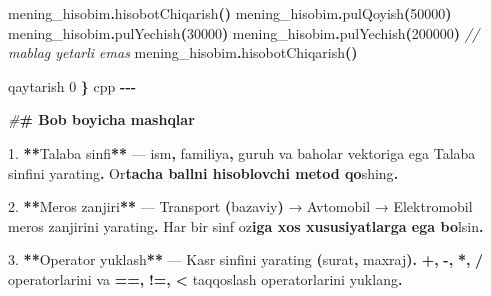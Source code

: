 \documentclass[a4paper,11pt,twoside,openright]{book}
\newenvironment{Shaded}{\begin{snugshade}}{\end{snugshade}}
\newcommand{\CharTok}[1]{\textcolor[rgb]{0.31,0.60,0.02}{#1}}
\newcommand{\CommentTok}[1]{\textcolor[rgb]{0.56,0.35,0.01}{\textit{#1}}}
\newcommand{\DecValTok}[1]{\textcolor[rgb]{0.00,0.00,0.81}{#1}}
\newcommand{\ErrorTok}[1]{\textcolor[rgb]{0.64,0.00,0.00}{\textbf{#1}}}
\newcommand{\FloatTok}[1]{\textcolor[rgb]{0.00,0.00,0.81}{#1}}
\newcommand{\NormalTok}[1]{#1}
\newcommand{\OperatorTok}[1]{\textcolor[rgb]{0.81,0.36,0.00}{\textbf{#1}}}
\newcommand{\PreprocessorTok}[1]{\textcolor[rgb]{0.56,0.35,0.01}{\textit{#1}}}
\begin{document}
\begin{Shaded}
\begin{Highlighting}[]
\NormalTok{    mening\_hisobim}\OperatorTok{.}\NormalTok{hisobotChiqarish}\OperatorTok{()}
\NormalTok{    mening\_hisobim}\OperatorTok{.}\NormalTok{pulQoyish}\OperatorTok{(}\DecValTok{50000}\OperatorTok{)}
\NormalTok{    mening\_hisobim}\OperatorTok{.}\NormalTok{pulYechish}\OperatorTok{(}\DecValTok{30000}\OperatorTok{)}
\NormalTok{    mening\_hisobim}\OperatorTok{.}\NormalTok{pulYechish}\OperatorTok{(}\DecValTok{200000}\OperatorTok{)}   \CommentTok{// mablag\textquotesingle{} yetarli emas}
\NormalTok{    mening\_hisobim}\OperatorTok{.}\NormalTok{hisobotChiqarish}\OperatorTok{()}

\NormalTok{    qaytarish }\DecValTok{0}
\OperatorTok{\}}
\ErrorTok{\textasciigrave{}\textasciigrave{}\textasciigrave{}}\NormalTok{cpp}
\OperatorTok{{-}{-}{-}}

\PreprocessorTok{\#}\ErrorTok{\# Bob bo\textquotesingle{}yicha mashqlar}

\FloatTok{1.} \OperatorTok{**}\ErrorTok{\textasciigrave{}}\NormalTok{Talaba}\ErrorTok{\textasciigrave{}}\NormalTok{ sinfi}\OperatorTok{**}\NormalTok{ — ism}\OperatorTok{,}\NormalTok{ familiya}\OperatorTok{,}\NormalTok{ guruh va baholar vektoriga ega }\ErrorTok{\textasciigrave{}}\NormalTok{Talaba}\ErrorTok{\textasciigrave{}}\NormalTok{ sinfini yarating}\OperatorTok{.}\NormalTok{ O}\CharTok{\textquotesingle{}r}\ErrorTok{tacha ballni hisoblovchi metod qo}\CharTok{\textquotesingle{}}\NormalTok{shing}\OperatorTok{.}

\FloatTok{2.} \OperatorTok{**}\NormalTok{Meros zanjiri}\OperatorTok{**}\NormalTok{ — }\ErrorTok{\textasciigrave{}}\NormalTok{Transport}\ErrorTok{\textasciigrave{}} \OperatorTok{(}\NormalTok{bazaviy}\OperatorTok{)}\NormalTok{ → }\ErrorTok{\textasciigrave{}}\NormalTok{Avtomobil}\ErrorTok{\textasciigrave{}}\NormalTok{ → }\ErrorTok{\textasciigrave{}}\NormalTok{Elektromobil}\ErrorTok{\textasciigrave{}}\NormalTok{ meros zanjirini yarating}\OperatorTok{.}\NormalTok{ Har bir sinf o}\CharTok{\textquotesingle{}z}\ErrorTok{iga xos xususiyatlarga ega bo}\CharTok{\textquotesingle{}}\NormalTok{lsin}\OperatorTok{.}

\FloatTok{3.} \OperatorTok{**}\NormalTok{Operator yuklash}\OperatorTok{**}\NormalTok{ — }\ErrorTok{\textasciigrave{}}\NormalTok{Kasr}\ErrorTok{\textasciigrave{}}\NormalTok{ sinfini yarating }\OperatorTok{(}\NormalTok{surat}\OperatorTok{,}\NormalTok{ maxraj}\OperatorTok{).} \ErrorTok{\textasciigrave{}}\OperatorTok{+}\ErrorTok{\textasciigrave{}}\OperatorTok{,} \ErrorTok{\textasciigrave{}}\OperatorTok{{-}}\ErrorTok{\textasciigrave{}}\OperatorTok{,} \ErrorTok{\textasciigrave{}}\OperatorTok{*}\ErrorTok{\textasciigrave{}}\OperatorTok{,} \ErrorTok{\textasciigrave{}}\OperatorTok{/}\ErrorTok{\textasciigrave{}}\NormalTok{ operatorlarini va }\ErrorTok{\textasciigrave{}}\OperatorTok{==}\ErrorTok{\textasciigrave{}}\OperatorTok{,} \ErrorTok{\textasciigrave{}}\OperatorTok{!=}\ErrorTok{\textasciigrave{}}\OperatorTok{,} \ErrorTok{\textasciigrave{}}\OperatorTok{\textless{}}\ErrorTok{\textasciigrave{}}\NormalTok{ taqqoslash operatorlarini yuklang}\OperatorTok{.}


\end{Highlighting}
\end{Shaded}
\end{document}
